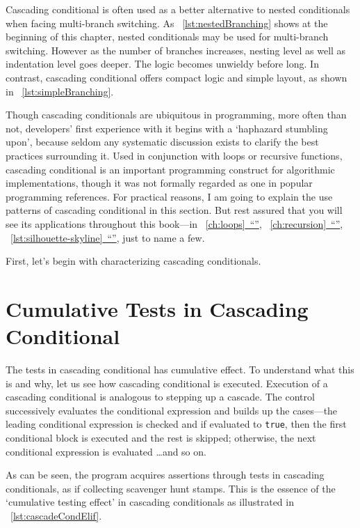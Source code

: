 \documentclass[oneside,11pt]{book}
\theoremstyle{definition}
\theoremstyle{remark}
\newcommand{\code}[1]{\mbox{\lstinline{#1}}}
\newcommand*{\fullref}[1]{\hyperref[{#1}]{\mbox{\autoref*{#1}~}``\nameref*{#1}''}}
\begin{document}
Cascading conditional is often used as a better alternative to nested conditionals
when facing multi-branch switching.
As ~\autoref{lst:nestedBranching} shows at the beginning of this chapter,
nested conditionals may be used for multi-branch switching.
However as the number of branches increases, nesting level as well as indentation level goes deeper.
The logic becomes unwieldy before long.
In contrast, cascading conditional offers compact logic and simple layout,
as shown in ~\autoref{lst:simpleBranching}.


Though cascading conditionals are ubiquitous in programming,
more often than not, developers' first experience with it begins with a `haphazard stumbling upon',
because seldom any systematic discussion exists to clarify the best practices surrounding it.
Used in conjunction with loops or recursive functions,
cascading conditional is an important programming construct for algorithmic implementations,
though it was not formally regarded as one in popular programming references.
For practical reasons, I am going to explain the use patterns of cascading conditional in this
section.
But rest assured that you will see its applications throughout this book---in
~\fullref{ch:loops}, ~\fullref{ch:recursion}, ~\fullref{lst:silhouette-skyline}, just to name a few.


First, let's begin with characterizing cascading conditionals.


\section{Cumulative Tests in Cascading Conditional}\label{sec:cumulativetests}

The tests in cascading conditional has cumulative effect.
To understand what this is and why, let us see how cascading conditional is executed.
Execution of a cascading conditional is analogous to stepping up a cascade.
The control successively evaluates the conditional expression and builds up the cases---the
leading conditional expression is checked and if evaluated to \code{true}, then the
first conditional block is executed and the rest is skipped;
otherwise, the next conditional expression is evaluated \ldots and so on.


As can be seen, the program acquires  assertions through tests in cascading
conditionals, as if collecting scavenger hunt stamps.
This is the essence of the `cumulative testing effect' in cascading conditionals as
illustrated in ~\autoref{lst:cascadeCondElif}.
\end{document}
